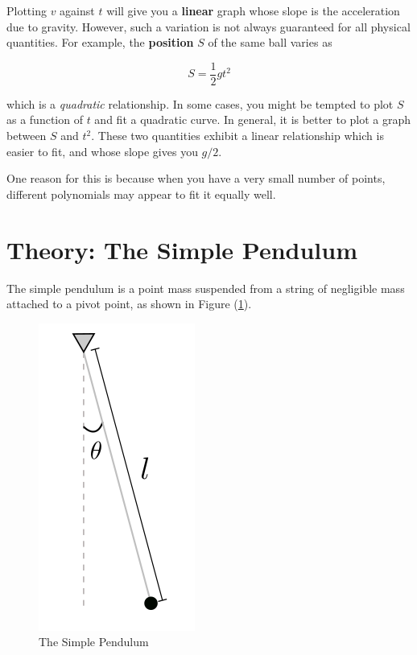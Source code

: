 Plotting $v$ against $t$ will give you a \textbf{linear} graph whose slope is the acceleration due to gravity. However, such a variation is not always guaranteed for all physical quantities. For example, the \textbf{position} $S$ of the same ball varies as

\begin{equation*}
    S = \frac{1}{2} g t^2
\end{equation*}

which is a \textit{quadratic} relationship. In some cases, you might be tempted to plot $S$ as a function of $t$ and fit a quadratic curve. In general, it is better to plot a graph between $S$ and $t^2$. These two quantities exhibit a linear relationship which is easier to fit, and whose slope gives you $g/2$.

One reason for this is because when you have a very small number of points, different polynomials may appear to fit it equally well.


\section{Theory: The Simple Pendulum}

The simple pendulum is a point mass suspended from a string of negligible mass attached to a pivot point, as shown in Figure (\ref{simple}). 

\begin{figure}[!htb]
    \centering
    \includegraphics[scale=0.5]{figs/simplependulum.png}
    \caption{The Simple Pendulum}
    \label{simple}
\end{figure}

